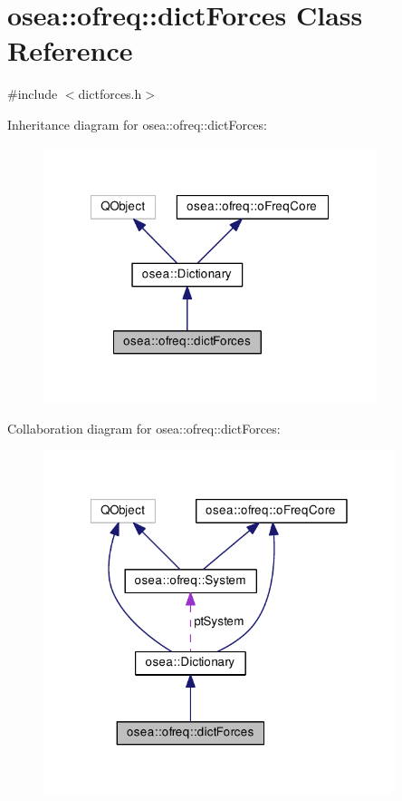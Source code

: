 \hypertarget{classosea_1_1ofreq_1_1dict_forces}{\section{osea\-:\-:ofreq\-:\-:dict\-Forces Class Reference}
\label{classosea_1_1ofreq_1_1dict_forces}
}


{\ttfamily \#include $<$dictforces.\-h$>$}



Inheritance diagram for osea\-:\-:ofreq\-:\-:dict\-Forces\-:\nopagebreak
\begin{figure}[H]
\begin{center}
\leavevmode
\includegraphics[width=275pt]{classosea_1_1ofreq_1_1dict_forces__inherit__graph}
\end{center}
\end{figure}


Collaboration diagram for osea\-:\-:ofreq\-:\-:dict\-Forces\-:\nopagebreak
\begin{figure}[H]
\begin{center}
\leavevmode
\includegraphics[width=291pt]{classosea_1_1ofreq_1_1dict_forces__coll__graph}
\end{center}
\end{figure}
